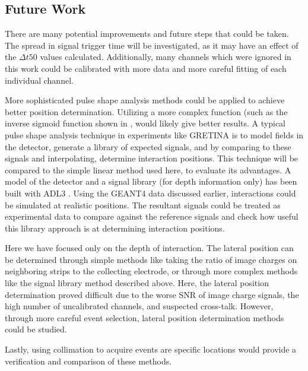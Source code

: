 \subsection*{Future Work}

There are many potential improvements and future steps that could be taken. The spread in signal trigger time will be investigated, as it may have an effect of the $\Delta t50$ values calculated. Additionally, many channels which were ignored in this work could be calibrated with more data and more careful fitting of each individual channel.

More sophisticated pulse shape analysis methods could be applied to achieve better position determination. Utilizing a more complex function (such as the inverse sigmoid function shown in \cite{cci21}, would likely give better results. A typical pulse shape analysis technique in experiments like GRETINA is to model fields in the detector, generate a library of expected signals, and by comparing to these signals and interpolating, determine interaction positions. This technique will be compared to the simple linear method used here, to evaluate its advantages. A model of the detector and a signal library (for depth information only) has been built with  ADL3 \cite{adl3}. Using the GEANT4 data discussed earlier, interactions could be simulated at realistic positions. The resultant signals could be treated as experimental data to compare against the reference signals and check how useful this library approach is at determining interaction positions.

Here we have focused only on the depth of interaction. The lateral position can be determined through simple methods like taking the ratio of image charges on neighboring strips to the collecting electrode, or through more complex methods like the signal library method described above. Here, the lateral position determination proved difficult due to the worse SNR of image charge signals, the high number of uncalibrated channels, and suspected cross-talk. However, through more careful event selection, lateral position determination methods could be studied.

Lastly, using collimation to acquire events are specific locations would provide a verification and comparison of these methods.
